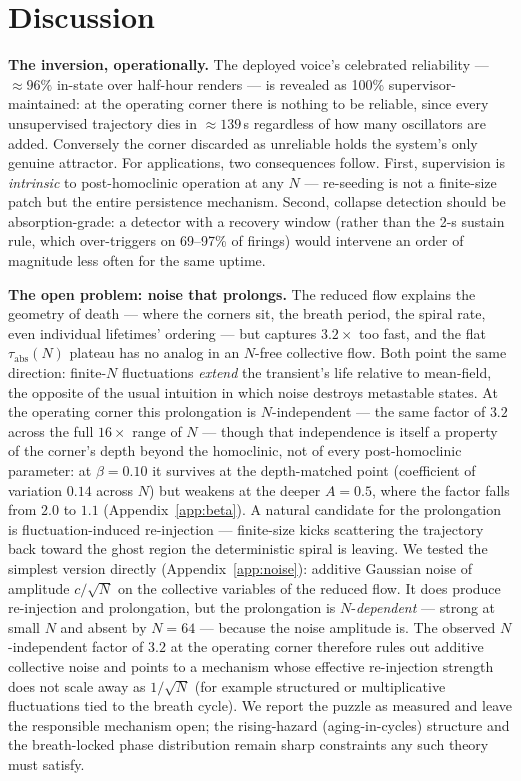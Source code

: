 \documentclass[pdflatex,sn-mathphys,Numbered]{sn-jnl}
\begin{document}
\section{Discussion}\label{sec:discussion}

\textbf{The inversion, operationally.} The deployed voice's celebrated reliability
--- $\approx 96\%$ in-state over half-hour renders --- is revealed as 100\%
supervisor-maintained: at the operating corner there is nothing to be reliable,
since every unsupervised trajectory dies in $\approx 139$\,s regardless of how many
oscillators are added. Conversely the corner discarded as unreliable holds the
system's only genuine attractor. For applications, two consequences follow. First,
supervision is \emph{intrinsic} to post-homoclinic operation at any $N$ ---
re-seeding is not a finite-size patch but the entire persistence mechanism. Second,
collapse detection should be absorption-grade: a detector with a recovery window
(rather than the 2-s sustain rule, which over-triggers on 69--97\% of firings)
would intervene an order of magnitude less often for the same uptime.

\textbf{The open problem: noise that prolongs.} The reduced flow explains the
geometry of death --- where the corners sit, the breath period, the spiral rate,
even individual lifetimes' ordering --- but captures $3.2\times$ too fast, and the
flat $\tau_{\mathrm{abs}}(N)$ plateau has no analog in an $N$-free collective flow.
Both point the same direction: finite-$N$ fluctuations \emph{extend} the transient's
life relative to mean-field, the opposite of the usual intuition in which noise
destroys metastable states. At the operating corner this prolongation is $N$-independent --- the same factor of
$3.2$ across the full $16\times$ range of $N$ --- though that independence is itself
a property of the corner's depth beyond the homoclinic, not of every post-homoclinic
parameter: at $\beta = 0.10$ it survives at the depth-matched point (coefficient of
variation $0.14$ across $N$) but weakens at the deeper $A = 0.5$, where the factor
falls from $2.0$ to $1.1$ (Appendix~\ref{app:beta}). A natural candidate for the
prolongation is fluctuation-induced re-injection --- finite-size kicks scattering the
trajectory back toward the ghost region the deterministic spiral is leaving. We
tested the simplest version directly (Appendix~\ref{app:noise}): additive Gaussian
noise of amplitude $c/\sqrt N$ on the collective variables of the reduced flow. It
does produce re-injection and prolongation, but the prolongation is
$N$-\emph{dependent} --- strong at small $N$ and absent by $N = 64$ --- because the
noise amplitude is. The observed $N$-independent factor of $3.2$ at the operating
corner therefore rules out additive collective noise and points to a mechanism whose
effective re-injection strength does not scale away as $1/\sqrt N$ (for example
structured or multiplicative fluctuations tied to the breath cycle). We report the
puzzle as measured and leave the responsible mechanism open; the rising-hazard
(aging-in-cycles) structure and the breath-locked phase distribution remain sharp
constraints any such theory must satisfy.
\end{document}
